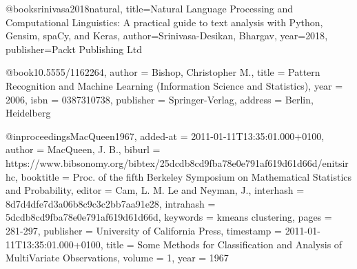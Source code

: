 @book{srinivasa2018natural,
  title={Natural Language Processing and Computational Linguistics: A practical guide to text analysis with Python, Gensim, spaCy, and Keras},
  author={Srinivasa-Desikan, Bhargav},
  year={2018},
  publisher={Packt Publishing Ltd}
}

@book{10.5555/1162264,
author = {Bishop, Christopher M.},
title = {Pattern Recognition and Machine Learning (Information Science and Statistics)},
year = {2006},
isbn = {0387310738},
publisher = {Springer-Verlag},
address = {Berlin, Heidelberg}
}

@inproceedings{MacQueen1967,
  added-at = {2011-01-11T13:35:01.000+0100},
  author = {MacQueen, J. B.},
  biburl = {https://www.bibsonomy.org/bibtex/25dcdb8cd9fba78e0e791af619d61d66d/enitsirhc},
  booktitle = {Proc. of the fifth Berkeley Symposium on Mathematical Statistics and Probability},
  editor = {Cam, L. M. Le and Neyman, J.},
  interhash = {8d7d4dfe7d3a06b8c9c3c2bb7aa91e28},
  intrahash = {5dcdb8cd9fba78e0e791af619d61d66d},
  keywords = {kmeans clustering},
  pages = {281-297},
  publisher = {University of California Press},
  timestamp = {2011-01-11T13:35:01.000+0100},
  title = {Some Methods for Classification and Analysis of MultiVariate Observations},
  volume = 1,
  year = 1967
}
